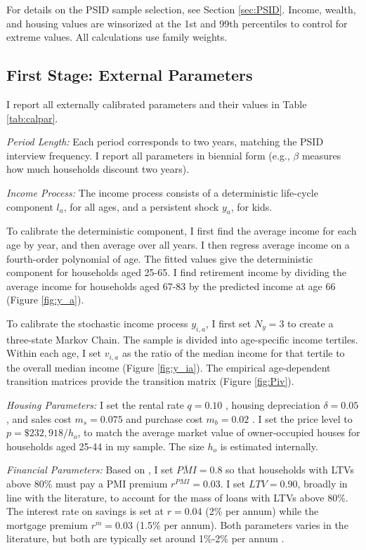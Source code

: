 \documentclass[12pt]{article}
\begin{document}
For details on the PSID sample selection, see Section \ref{sec:PSID}. Income, wealth, and housing values are winsorized at the 1st and 99th percentiles to control for extreme values. All calculations use family weights. 

\subsection{First Stage: External Parameters}
I report all externally calibrated parameters and their values in Table \ref{tab:calpar}.

\textit{Period Length:} Each period corresponds to two years, matching the PSID interview frequency. I report all parameters in biennial form (e.g., $\beta$ measures how much households discount two years).

\textit{Income Process:} The income process consists of a deterministic life-cycle component $l_a$, for all ages, and a persistent shock $y_a$, for kids. 

To calibrate the deterministic component, I first find the average income for each age by year, and then average over all years. I then regress average income on a fourth-order polynomial of age. The fitted values give the deterministic component for households aged 25-65. I find retirement income by dividing the average income for households aged 67-83 by the predicted income at age 66 (Figure \ref{fig:y_a}). 

To calibrate the stochastic income process $y_{i,a}$, I first set $N_y=3$ to create a three-state Markov Chain. The sample is divided into age-specific income tertiles. Within each age, I set $v_{i,a}$ as the ratio of the median income for that tertile to the overall median income (Figure \ref{fig:y_ia}). The empirical age-dependent transition matrices provide the transition matrix (Figure \ref{fig:Piv}).

\textit{Housing Parameters:} I set the rental rate $q=0.10$ \citep{Davis2008}, housing depreciation $\delta=0.05$ \citep{Harding2007}, and sales cost $m_s=0.075$ and purchase cost $m_b=0.02$ \citep{Yang2009}. I set the price level to $p=\$232,918/h_o$, to match the average market value of owner-occupied houses for households aged 25-44 in my sample. The size $h_o$ is estimated internally.

\textit{Financial Parameters:} Based on \cite{goodman2017sixty}, I set $\overline{PMI}=0.8$ so that households with LTVs above 80\% must pay a PMI premium $r^{PMI}=0.03$. I set $LTV=0.90$, broadly in line with the literature, to account for the mass of loans with LTVs above 80\%. The interest rate on savings is set at $r = 0.04$ (2\% per annum) while the mortgage premium $r^m=0.03$ (1.5\% per annum). Both parameters varies in the literature, but both are typically set around 1\%-2\% per annum \citep[see e.g.,][]{Cocco2005b,Kaplan2020,Paz-Pardo2019}.
\end{document}
